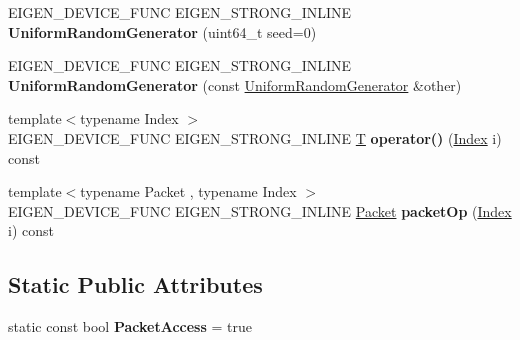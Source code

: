 \begin{DoxyCompactItemize}
\item 
\mbox{\label{class_eigen_1_1internal_1_1_uniform_random_generator_aedf399a1d9468154a90f5b6bca799d82}} 
E\+I\+G\+E\+N\+\_\+\+D\+E\+V\+I\+C\+E\+\_\+\+F\+U\+NC E\+I\+G\+E\+N\+\_\+\+S\+T\+R\+O\+N\+G\+\_\+\+I\+N\+L\+I\+NE {\bfseries Uniform\+Random\+Generator} (uint64\+\_\+t seed=0)
\item 
\mbox{\label{class_eigen_1_1internal_1_1_uniform_random_generator_a97b9c2bc04be36b4f511d70131d6cc24}} 
E\+I\+G\+E\+N\+\_\+\+D\+E\+V\+I\+C\+E\+\_\+\+F\+U\+NC E\+I\+G\+E\+N\+\_\+\+S\+T\+R\+O\+N\+G\+\_\+\+I\+N\+L\+I\+NE {\bfseries Uniform\+Random\+Generator} (const \hyperlink{class_eigen_1_1internal_1_1_uniform_random_generator}{Uniform\+Random\+Generator} \&other)
\item 
\mbox{\label{class_eigen_1_1internal_1_1_uniform_random_generator_a620623213b13e27aa1590dc9e605b56e}} 
{\footnotesize template$<$typename Index $>$ }\\E\+I\+G\+E\+N\+\_\+\+D\+E\+V\+I\+C\+E\+\_\+\+F\+U\+NC E\+I\+G\+E\+N\+\_\+\+S\+T\+R\+O\+N\+G\+\_\+\+I\+N\+L\+I\+NE \hyperlink{group___sparse_core___module}{T} {\bfseries operator()} (\hyperlink{namespace_eigen_a62e77e0933482dafde8fe197d9a2cfde}{Index} i) const
\item 
\mbox{\label{class_eigen_1_1internal_1_1_uniform_random_generator_a6f28e945355106c147b1d7c27ba6c995}} 
{\footnotesize template$<$typename Packet , typename Index $>$ }\\E\+I\+G\+E\+N\+\_\+\+D\+E\+V\+I\+C\+E\+\_\+\+F\+U\+NC E\+I\+G\+E\+N\+\_\+\+S\+T\+R\+O\+N\+G\+\_\+\+I\+N\+L\+I\+NE \hyperlink{union_eigen_1_1internal_1_1_packet}{Packet} {\bfseries packet\+Op} (\hyperlink{namespace_eigen_a62e77e0933482dafde8fe197d9a2cfde}{Index} i) const
\end{DoxyCompactItemize}
\subsection*{Static Public Attributes}
\begin{DoxyCompactItemize}
\item 
\mbox{\label{class_eigen_1_1internal_1_1_uniform_random_generator_ad3b18761dd653ff6b5a3c115e10d5062}} 
static const bool {\bfseries Packet\+Access} = true
\end{DoxyCompactItemize}


